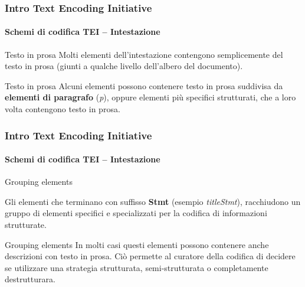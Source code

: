 \begin{frame}
	\frametitle{Intro Text Encoding Initiative}
	\framesubtitle{Schemi di codifica TEI – Intestazione}
	\addtocounter{nframe}{1}

    \begin{block}{Testo in prosa}
        Molti elementi dell'intestazione contengono semplicemente del testo in prosa (giunti a qualche livello dell'albero del documento).
    \end{block}

    \begin{block}{Testo in prosa}
       Alcuni elementi possono contenere testo in prosa suddivisa da \textbf{elementi di paragrafo} (\textit{p}), oppure elementi più specifici strutturati, che a loro volta contengono testo in prosa.
    \end{block}
\textit{}

\end{frame}


\begin{frame}
	\frametitle{Intro Text Encoding Initiative}
	\framesubtitle{Schemi di codifica TEI – Intestazione}
	\addtocounter{nframe}{1}

    \begin{block}{Grouping elements}
 
        Gli elementi che terminano con suffisso \textbf{Stmt} (esempio \textit{titleStmt}), racchiudono un gruppo di elementi specifici e specializzati per la codifica di informazioni strutturate.
    \end{block}

    \begin{block}{Grouping elements}
        In molti casi questi elementi possono contenere anche descrizioni con testo in prosa. Ciò permette al curatore della codifica di decidere se utilizzare una strategia strutturata, semi-strutturata o completamente destrutturara.
    \end{block}
\textit{}

\end{frame}


